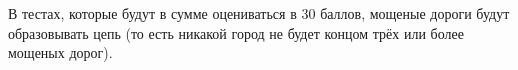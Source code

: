 В тестах, которые будут в сумме оцениваться в $30$ баллов, мощеные дороги будут образовывать цепь (то есть никакой город не будет концом трёх или более мощеных дорог). 
